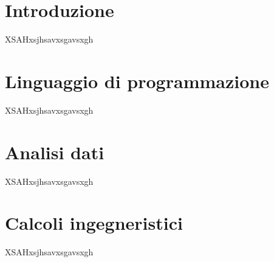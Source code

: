 \documentclass{article}                                                                                                     %
\begin{document}
\section{Introduzione}                                                                                                      %
\label{sec:introduction}                                                                                                    %
  XSAHxsjhsavxsgavsxgh                                                                                                      %

\section{Linguaggio di programmazione}                                                                                      %
\label{sec:progr_lang}                                                                                                      %
  XSAHxsjhsavxsgavsxgh                                                                                                      %

\section{Analisi dati}                                                                                                      %
\label{sec:data_analysis}                                                                                                   %
  XSAHxsjhsavxsgavsxgh                                                                                                      %

\section{Calcoli ingegneristici}                                                                                            %
\label{sec:engineering_calcs}                                                                                               %
  XSAHxsjhsavxsgavsxgh                                                                                                      %
\end{document}

